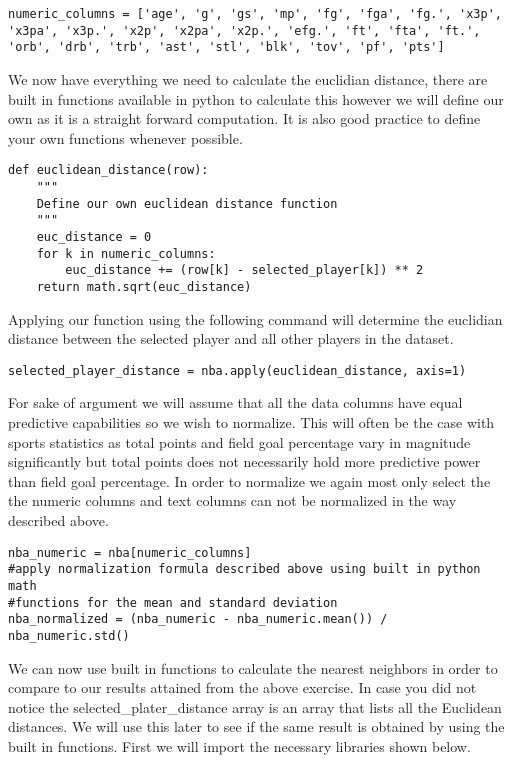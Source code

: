 \begin{lstlisting}
numeric_columns = ['age', 'g', 'gs', 'mp', 'fg', 'fga', 'fg.', 'x3p',
'x3pa', 'x3p.', 'x2p', 'x2pa', 'x2p.', 'efg.', 'ft', 'fta', 'ft.',
'orb', 'drb', 'trb', 'ast', 'stl', 'blk', 'tov', 'pf', 'pts']
\end{lstlisting} 

We now have everything we need to calculate the euclidian distance,
there are built in functions available in python to calculate this
however we will define our own as it is a straight forward
computation. It is also good practice to define your own functions
whenever possible. 

\begin{lstlisting}
def euclidean_distance(row):
    """
    Define our own euclidean distance function
    """
    euc_distance = 0
    for k in numeric_columns:
        euc_distance += (row[k] - selected_player[k]) ** 2
    return math.sqrt(euc_distance)
\end{lstlisting} 

Applying our function using the following command will determine the
euclidian distance between the selected player and all other players
in the dataset. 

\begin{lstlisting}
selected_player_distance = nba.apply(euclidean_distance, axis=1)
\end{lstlisting} 

For sake of argument we will assume that all the data columns have
equal predictive capabilities so we wish to normalize. This will often
be the case with sports statistics as total points and field goal
percentage vary in magnitude significantly but total points does not
necessarily hold more predictive power than field goal percentage. In
order to normalize we again most only select the the numeric columns
and text columns can not be normalized in the way described above. 


\begin{lstlisting}
nba_numeric = nba[numeric_columns]
#apply normalization formula described above using built in python math
#functions for the mean and standard deviation
nba_normalized = (nba_numeric - nba_numeric.mean()) / nba_numeric.std()
\end{lstlisting} 

We can now use built in functions to calculate the nearest
neighbors in order to compare to our results attained from the above
exercise. In case you did not notice the selected\_plater\_distance
array is an array that lists all the Euclidean distances. We will use
this later to see if the same result is obtained by using the built in
functions. First we will import the necessary libraries shown below. 

